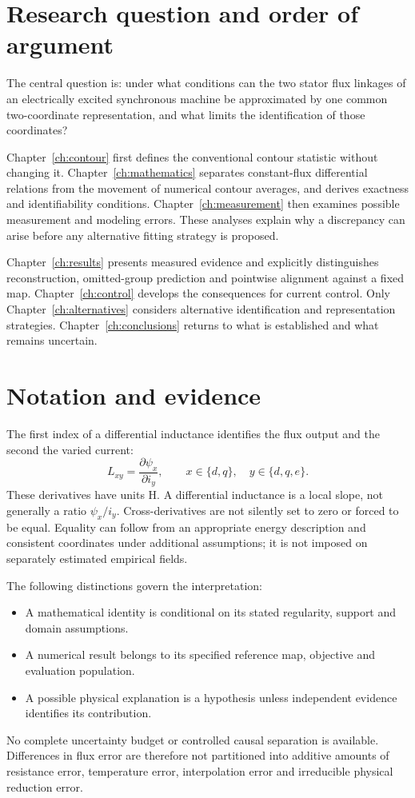 \section{Research question and order of argument}
The central question is: under what conditions can the two stator flux linkages of an electrically excited synchronous machine be approximated by one common two-coordinate representation, and what limits the identification of those coordinates?

Chapter~\ref{ch:contour} first defines the conventional contour statistic without changing it. Chapter~\ref{ch:mathematics} separates constant-flux differential relations from the movement of numerical contour averages, and derives exactness and identifiability conditions. Chapter~\ref{ch:measurement} then examines possible measurement and modeling errors. These analyses explain why a discrepancy can arise before any alternative fitting strategy is proposed.

Chapter~\ref{ch:results} presents measured evidence and explicitly distinguishes reconstruction, omitted-group prediction and pointwise alignment against a fixed map. Chapter~\ref{ch:control} develops the consequences for current control. Only Chapter~\ref{ch:alternatives} considers alternative identification and representation strategies. Chapter~\ref{ch:conclusions} returns to what is established and what remains uncertain.

\section{Notation and evidence}
The first index of a differential inductance identifies the flux output and the second the varied current:
\begin{equation}\label{eq:inductance-definition}
L_{xy}=\frac{\partial\psi_x}{\partial i_y},
\qquad x\in\{d,q\},\quad y\in\{d,q,e\}.
\end{equation}
These derivatives have units H. A differential inductance is a local slope, not generally a ratio $\psi_x/i_y$. Cross-derivatives are not silently set to zero or forced to be equal. Equality can follow from an appropriate energy description and consistent coordinates under additional assumptions; it is not imposed on separately estimated empirical fields.

The following distinctions govern the interpretation:
\begin{itemize}
\item A mathematical identity is conditional on its stated regularity, support and domain assumptions.
\item A numerical result belongs to its specified reference map, objective and evaluation population.
\item A possible physical explanation is a hypothesis unless independent evidence identifies its contribution.
\end{itemize}
No complete uncertainty budget or controlled causal separation is available. Differences in flux error are therefore not partitioned into additive amounts of resistance error, temperature error, interpolation error and irreducible physical reduction error.
